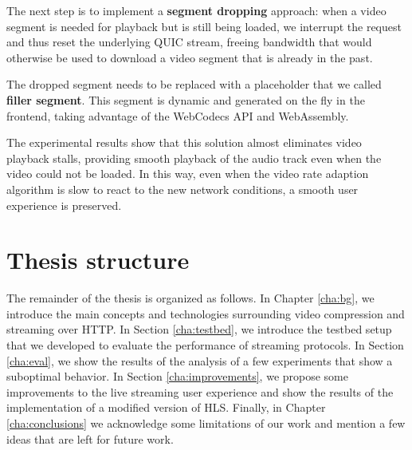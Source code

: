 The next step is to implement a \textbf{segment dropping} approach: when a video segment is needed for playback but is still being loaded, we interrupt the request and thus reset the underlying QUIC stream, freeing bandwidth that would otherwise be used to download a video segment that is already in the past.

The dropped segment needs to be replaced with a placeholder that we called \textbf{filler segment}. This segment is dynamic and generated on the fly in the frontend, taking advantage of the WebCodecs API and WebAssembly.

The experimental results show that this solution almost eliminates video playback stalls, providing smooth playback of the audio track even when the video could not be loaded. In this way, even when the video rate adaption algorithm is slow to react to the new network conditions, a smooth user experience is preserved.

\section{Thesis structure}
\label{sec:intro/structure}

The remainder of the thesis is organized as follows. In Chapter \ref{cha:bg}, we introduce the main concepts and technologies surrounding video compression and streaming over HTTP. In Section \ref{cha:testbed}, we introduce the testbed setup that we developed to evaluate the performance of streaming protocols. In Section \ref{cha:eval}, we show the results of the analysis of a few experiments that show a suboptimal behavior. In Section \ref{cha:improvements}, we propose some improvements to the live streaming user experience and show the results of the implementation of a modified version of HLS. Finally, in Chapter \ref{cha:conclusions} we acknowledge some limitations of our work and mention a few ideas that are left for future work.

